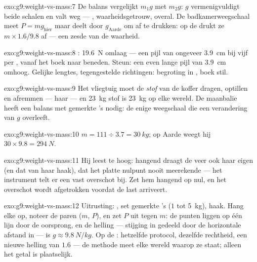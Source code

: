 \begin{solution}{exo:g9:weight-vs-mass:7}
De balans vergelijkt $m_1 g$ met $m_2 g$: $g$ vermenigvuldigt beide
schalen en valt weg --- , waarheidsgetrouw, overal. De
badkamerweegschaal meet $P = m g_{\text{hier}}$ maar deelt door
$g_{\text{Aarde}}$ om  af te drukken: op de
 drukt ze $m \times 1.6/9.8$ af --- een zesde van de
waarheid.
\end{solution}

\begin{solution}{exo:g9:weight-vs-mass:8}
: \qty{19.6}{N} omlaag --- een pijl van ongeveer
\qty{3.9}{cm} bij vijf  per
, vanaf het boek naar beneden. Steun: een even lange
pijl van \qty{3.9}{cm} omhoog. Gelijke lengtes, tegengestelde
richtingen: begroting in , boek stil.
\end{solution}

\begin{solution}{exo:g9:weight-vs-mass:9}
Het vliegtuig moet de \emph{stof} van de koffer dragen, optillen en
afremmen --- haar  --- en \qty{23}{kg} stof is
\qty{23}{kg} op elke wereld. De maanbalie heeft een balans met gemerkte
's nodig: de enige weegschaal die een verandering van $g$
overleeft.
\end{solution}

\begin{solution}{exo:g9:weight-vs-mass:10}
$m = 111 \div 3.7 = \qty{30}{kg}$; op Aarde weegt hij $30 \times 9.8 =
\qty{294}{N}$.
\end{solution}

\begin{solution}{exo:g9:weight-vs-mass:11}
Hij leest te hoog: hangend draagt de veer ook haar eigen
 (en dat van haar haak), dat het platte nulpunt nooit
meerekende --- het instrument telt er een vast overschot bij. Zet hem
hangend op nul, en het overschot wordt afgetrokken voordat de last
arriveert.
\end{solution}

\begin{solution}{exo:g9:weight-vs-mass:12}
Uitrusting: , set gemerkte 's ($1$ tot
\qty{5}{kg}), haak. Hang elke  op, noteer de paren ($m$,
$P$), en zet $P$ uit tegen $m$: de punten liggen op één lijn door de
oorsprong, en de helling --- stijging in  gedeeld door
de horizontale afstand in  --- is $g \approx
\qty{9.8}{N/kg}$. Op de : hetzelfde protocol, dezelfde
rechtheid, een nieuwe helling van $1.6$ --- de methode
meet elke wereld waarop ze staat; alleen het getal is
plaatselijk.
\end{solution}

